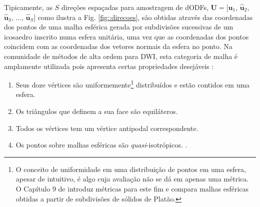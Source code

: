 \documentclass[
    12pt,                %
    oneside,            %
    a4paper,            %
    english,            %
    french,                %
    spanish,            %
    brazil                %
    ]{abntex2}
\begin{document}
Tipicamente, as $S$ direções espaçadas para amostragem de dODFs,
$\mathbf{U} = [
\mathbf{\hat{u}}_1$, 
$\mathbf{\hat{u}}_2$, 
$\mathbf{\hat{u}}_3$, ..., 
$\mathbf{\hat{u}}_S]$ como ilustra a Fig. \ref{fig::direcoes}, são obtidas através das coordenadas dos pontos de uma malha esférica gerada por subdivisões sucessivas de um icosaedro inscrito numa esfera unitária, uma vez que as coordenadas dos pontos coincidem com as coordenadas dos vetores normais da esfera no ponto. Na comunidade de métodos de alta ordem para DWI, esta categoria de malha é amplamente utilizada \cite{yeh2010, TuchQBall2004, descoteaux2007} pois apresenta certas propriedades desejáveis  \cite{popko2012}:

\begin{enumerate}
    \item Seus doze vértices são uniformemente\footnote{O conceito de uniformidade em uma distribuição de pontos em uma esfera, apesar de intuitivo, é algo cuja avaliação não se dá em apenas uma métrica. O Capítulo 9 de \cite{popko2012} introduz métricas para este fim e compara malhas esféricas obtidas a partir de subdivisões de sólidos de Platão.} distribuídos e estão contidos em uma esfera.
    \item Os triângulos que definem a sua face são equiláteros.
    \item Todos os vértices tem um vértice antipodal correspondente.
    \item Os pontos sobre malhas esféricas são \textit{quasi}-isotrópicos. \cite{popko2012}.
\end{enumerate}


\end{document}
